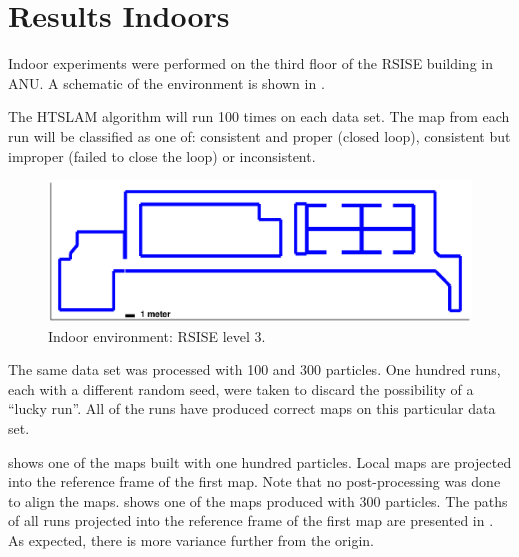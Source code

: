 \section {Results Indoors}

Indoor experiments were performed on the third floor of the RSISE
building in ANU. A schematic of the environment is shown in
.

The HTSLAM algorithm will run 100 times on each data set. The map from
each run will be classified as one of: consistent and proper (closed
loop), consistent but improper (failed to close the loop) or
inconsistent.

 
\begin{figure}[htbp]
  \centering
  \includegraphics[width=13cm]{Pics/rsise_level3_map}
  \caption{Indoor environment: RSISE level 3.}
  \label{fig:rsise_level3_map}
\end{figure}

The same data set was processed with 100 and 300 particles. One
hundred runs, each with a different random seed, were taken to discard
the possibility of a ``lucky run''. All of the runs have produced
correct maps on this particular data set.

 shows one of the maps built with
one hundred particles. Local maps are projected into the reference frame
of the first map. Note that no post-processing was done to align the
maps.  shows one of the maps produced
with 300 particles. The paths of all runs projected into the reference
frame of the first map are presented in
. As expected, there is more variance
further from the origin.


